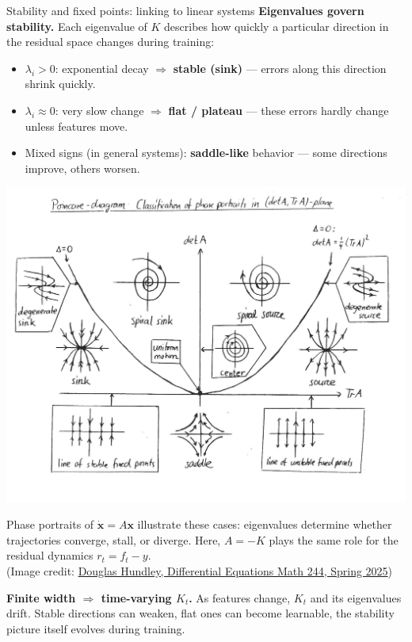 \documentclass[final,12pt]{beamer}
\begin{document}
\begin{frame}[t]
\begin{columns}[t,totalwidth=\textwidth]
\begin{column}{.36\textwidth}
\begin{block}{Stability and fixed points: linking to linear systems}
				\medskip
				\textbf{Eigenvalues govern stability.}
				Each eigenvalue of \(K\) describes how quickly a particular direction in the residual space changes during training:
				\begin{itemize}\setlength{\itemsep}{0.7ex}
					\item \(\lambda_i > 0\): exponential decay $\Rightarrow$ \textbf{stable (sink)} — errors along this direction shrink quickly.
					\item \(\lambda_i \approx 0\): very slow change $\Rightarrow$ \textbf{flat / plateau} — these errors hardly change unless features move.
					\item Mixed signs (in general systems): \textbf{saddle-like} behavior — some directions improve, others worsen.
				\end{itemize}

				\medskip
				\centering
				\includegraphics[width=0.85\columnwidth]{pictures/phase-portrait.jpg}

				\small
				Phase portraits of $\dot{\mathbf{x}}=A\mathbf{x}$ illustrate these cases: eigenvalues determine whether trajectories converge, stall, or diverge.
				Here, \(A=-K\) plays the same role for the residual dynamics \(r_t=f_t-y\).\\
				(Image credit: \href{http://people.whitman.edu/~hundledr/courses/M244.html}{Douglas Hundley, Differential Equations Math 244, Spring 2025})

				\bigskip
				\textbf{Finite width \(\Rightarrow\) time-varying \(K_t\).}
				As features change, \(K_t\) and its eigenvalues drift.
				Stable directions can weaken, flat ones can become learnable, the stability picture itself evolves during training.


\end{block}
\end{column}
\end{columns}
\end{frame}
\end{document}
